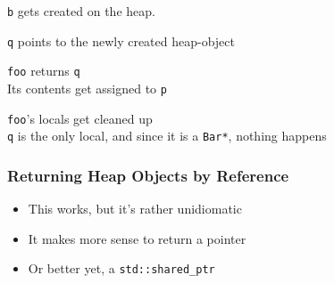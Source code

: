 \begin{frame}
\begin{overprint}
    \begin{center}
      {\tt b} gets created on the heap.
    \end{center}

    \begin{center}
      {\tt q} points to the newly created heap-object
    \end{center}

    \begin{center}
      {\tt foo} returns {\tt q} \\
      Its contents get assigned to {\tt p}
    \end{center}

    \begin{center}
      {\tt foo}'s locals get cleaned up \\
      {\tt q} is the only local, and since it is a {\tt Bar*}, nothing happens
    \end{center}
  \end{overprint}
\end{frame}

\begin{frame}
  \frametitle{Returning Heap Objects by Reference}
  \begin{itemize}
    \item This works, but it's rather unidiomatic
    \item It makes more sense to return a pointer
    \item Or better yet, a {\tt std::shared\_ptr}
  \end{itemize}
\end{frame}


